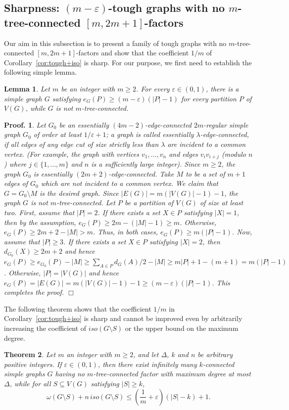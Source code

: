 \documentclass[10pt,bezier]{article}
\newtheorem{prethm}{{\bf Theorem}}[section]
\newenvironment{thm}{\begin{prethm}{\hspace{-0.5
em}{\bf.}}}{\end{prethm}}
\newtheorem{prelem}[prethm]{{\bf Lemma}}
\newenvironment{lem}{\begin{prelem}{\hspace{-0.5
em}{\bf.}}}{\end{prelem}}
\newtheorem{preproof}{{\bf Proof.}}
\newenvironment{proof}[1]{\begin{preproof}{\rm
#1}\hfill{$\Box$}}{\end{preproof}}
\begin{document}
\subsection{Sharpness: $(m-\varepsilon)$-tough graphs with no $m$-tree-connected $[m,2m+1]$-factors}
%
 Our aim in this subsection is to present a family of tough graphs with no $m$-tree-connected $[m,2m+1]$-factors and show that the coefficient $1/m$ of Corollary~\ref{cor:tough+iso} is sharp. For our purpose, we first need to establish the following simple lemma.
%
\begin{lem}\label{lem:m-epsilon}
{Let $m$ be an integer with $m\ge 2$. For every $\varepsilon \in (0,1)$, there is a simple graph $G$ satisfying
 $e_G(P)\ge (m-\varepsilon)(|P|-1)$ for every partition $P$ of $V(G)$, while $G$ is not $m$-tree-connected. 
}\end{lem}
\begin{proof}
{Let $G_0$ be an essentially $(4m-2)$-edge-connected $2m$-regular simple graph $G_0$ of order at least $ 1/\varepsilon +1$; 
a graph is called {\it essentially $\lambda$-edge-connected},
 if all edges of any edge cut of size strictly less than $\lambda$ are incident to a common vertex.
(For example, the graph with vertices $v_1, \ldots, v_n$ and edges $v_iv_{i+j}$ (modulo $n$) where $j\in \{1,\ldots, m\}$ and $n$ is a sufficiently large integer). Since $m\ge 2$, the graph $G_0$ is essentially $(2m+2)$-edge-connected.
Take $M$ to be a set of $m+1$ edges of $G_0$ which are not incident to a common vertex. 
We claim that $G=G_0\setminus M$ is the desired graph.
Since $|E(G)|=m(|V(G)|-1)-1$, the graph $G$ is not $m$-tree-connected. 
Let $P$ be a partition of $V(G)$ of size at least two.
First, assume that $|P|= 2$.
If there exists a set $X\in P$ satisfying $|X| = 1$, then by the assumption, $e_G(P)\ge 2m-(|M|-1)\ge m$.
Otherwise, $e_G(P)\ge 2m+2-|M|> m$.
%
Thus, in both cases, $e_G(P)\ge m(|P|-1)$.
Now, assume that $|P|\ge 3$.
%
If there exists a set $X\in P$ satisfying $|X| = 2$, then $d_{G_0}(X)\ge 2m+2$ 
and hence $e_G(P)\ge e_{G_0}(P)-|M|\ge 
\sum_{A\in P}d_G(A)/2-|M| \ge m|P|+1-(m+1)= m(|P|-1)$.
%
Otherwise, $|P|=|V(G)|$ and hence
$e_G(P)=|E(G)|=m(|V(G)|-1)-1\ge (m-\varepsilon)(|P|-1)$.
This completes the proof.
}\end{proof}
%
The following theorem shows that the coefficient $1/m$ in Corollary~\ref{cor:tough+iso} is sharp and cannot be improved 
even by arbitrarily increasing the coefficient of $iso(G\setminus S)$ or the upper bound on the maximum degree.
%
\def\Ks {\text{$R_s$}}
%
\begin{thm}\label{thm:exam:iso:tree-connected}
{Let $m$ an integer with $m\ge 2$, and let $\Delta$, $k$ and $n$ be arbitrary positive integers. 
If $\varepsilon\in (0,1)$, then there exist infinitely many $k$-connected simple graphs $G$ having no $m$-tree-connected factor with maximum degree at most $\Delta$, while for all $S\subseteq V(G)$ satisfying $|S|\ge k$, 
$$ \omega(G\setminus S)+n\, iso(G\setminus S) \le (\frac{1}{m}+\varepsilon)(|S|-k)+1.$$
}\end{thm}
\end{document}

